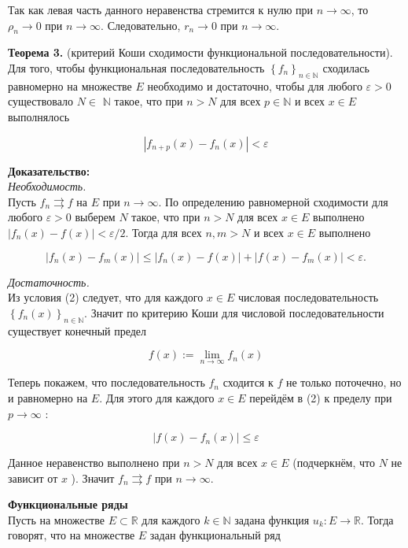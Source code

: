 \documentclass[a4paper,12pt]{article} %
\begin{document}
	Так как левая часть данного неравенства стремится к нулю при $n \rightarrow \infty$, то $\rho_{n} \rightarrow 0$ при $n \rightarrow \infty$. Следовательно, $r_{n} \rightarrow 0$ при $n \rightarrow \infty$.
	
	\textbf{Теорема 3.} (критерий Коши сходимости функциональной последовательности). Для того, чтобы функциональная последовательность $\left\{f_{n}\right\}_{n \in \mathbb{N}}$ сходилась равномерно на множестве $E$ необходимо и достаточно, чтобы для любого $\varepsilon>0$ существовало $N \in$ $\mathbb{N}$ такое, что при $n>N$ для всех $p \in \mathbb{N}$ и всех $x \in E$ выполнялось
	
	$$
	\left|f_{n+p}(x)-f_{n}(x)\right|<\varepsilon
	$$
	
	\textbf{Доказательство:\\}
	\textit{Необходимость.}\\ Пусть $f_{n} \rightrightarrows f$ на $E$ при $n \rightarrow \infty$. По определению равномерной сходимости для любого $\varepsilon>0$ выберем $N$ такое, что при $n>N$ для всех $x \in E$ выполнено $\left|f_{n}(x)-f(x)\right|<\varepsilon / 2$. Тогда для всех $n, m>N$ и всех $x \in E$ выполнено
	
	$$
	\left|f_{n}(x)-f_{m}(x)\right| \leq\left|f_{n}(x)-f(x)\right|+\left|f(x)-f_{m}(x)\right|<\varepsilon .
	$$
	
	\textit{Достаточность.}\\ Из условия (2) следует, что для каждого $x \in E$ числовая последовательность $\left\{f_{n}(x)\right\}_{n \in \mathbb{N}}$. Значит по критерию Коши для числовой последовательности существует конечный предел
	
	$$
	f(x):=\lim _{n \rightarrow \infty} f_{n}(x)
	$$
	
	Теперь покажем, что последовательность $f_{n}$ сходится к $f$ не только поточечно, но и равномерно на $E$. Для этого для каждого $x \in E$ перейдём в (2) к пределу при $p \rightarrow \infty$ :
	
	$$
	\left|f(x)-f_{n}(x)\right| \leq \varepsilon
	$$
	
	Данное неравенство выполнено при $n>N$ для всех $x \in E$ (подчеркнём, что $N$ не зависит от $x$ ). Значит $f_{n} \rightrightarrows f$ при $n \rightarrow \infty$.
	
	\textbf{Функциональные ряды}\\
	Пусть на множестве $E \subset \mathbb{R}$ для каждого $k \in \mathbb{N}$ задана функция $u_{k}: E \rightarrow \mathbb{R}$. Тогда говорят, что на множестве $E$ задан функциональный ряд
	
\end{document}
